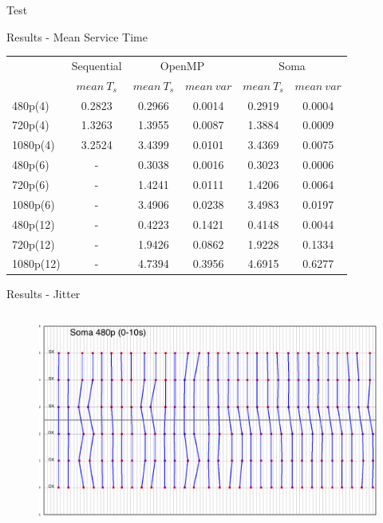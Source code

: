 \documentclass[xcolor=dvipsnames]{beamer}
\begin{document}
\begin{section}{Test}
\begin{frame}{\hskip 0.3cm Results - Mean Service Time}
\begin{center}
{\begin{tabular}{| l || c || c | c || c | c |}
\hline
 & \multicolumn{1}{|c||}{Sequential} & \multicolumn{2}{|c||}{OpenMP} & \multicolumn{2}{|c|}{Soma} \\
\cline{2-6}
  & $mean\ T_s$ & $mean\ T_s$ & $mean\ var$ & $mean\ T_s$ & $mean\ var$ \\
\cline{2-6}
\hline
480p(4) & 0.2823 & 0.2966 & 0.0014 & 0.2919 & 0.0004 \\
\hline
720p(4) & 1.3263 & 1.3955 & 0.0087 & 1.3884 & 0.0009 \\
\hline
1080p(4) & 3.2524 & 3.4399 & 0.0101 & 3.4369 & 0.0075 \\
\hline 
\hline
480p(6) & - & 0.3038 & 0.0016 & 0.3023 & 0.0006 \\
\hline
720p(6) & - & 1.4241 & 0.0111 & 1.4206 & 0.0064 \\
\hline
1080p(6) & - & 3.4906 & 0.0238 & 3.4983 & 0.0197 \\
\hline 
\hline
480p(12) & - & 0.4223 & 0.1421 & 0.4148 & 0.0044 \\
\hline
720p(12) & - & 1.9426 & 0.0862 & 1.9228 & 0.1334 \\
\hline
1080p(12) & - & 4.7394 & 0.3956 & 4.6915 & 0.6277 \\
\hline 
\end{tabular} }
\end{center}







\end{frame}













\begin{frame}{\hskip 0.3cm Results - Jitter}

\begin{columns}
\begin{column}{6.5cm}

\begin{figure}

\includegraphics[scale=0.13]{soma_480_range_010.png}
\end{figure}


\end{column}
\end{columns}
\end{frame}
\end{section}
\end{document}
